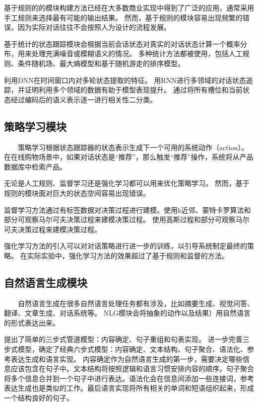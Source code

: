 \documentclass{clv3}
\begin{document}
基于规则的的模块构建方法已经在大多数商业实现中得到了广泛的应用，通常采用手工规则来选择最有可能的输出结果\cite{goddeau1996a}。
然而，基于规则的模块容易出现频繁的错误，因为实际对话往往不会按照人为设计的流程发展\cite{williams2013multi}。

基于统计的状态跟踪模块会根据当前会话状态对真实的对话状态计算一个概率分布\cite{williams2013the}，用来处理充满噪音或模糊语义的情况。
多种统计方法都被使用，包括人工规则\cite{wang2013a}、条件随机场\cite{ren2013dialog, lee2013structured, kim2014sequential}、最大熵模型\cite{williams2013multi}和基于随机游走\cite{williams2014web}的排序模型。

\cite{henderson2013deep}利用DNN在时间窗口内对多轮状态提取的特征。
\cite{mrkšić2015multi}用RNN进行多领域的对话状态追踪，并证明利用多个领域的数据有助于模型表现提升。
\cite{mrksic2017neural}通过将所有槽位和当前状态经过编码后的语义表示逐一进行相关性二分类。


\subsection{策略学习模块}
$\qquad$策略学习根据状态跟踪器的状态表示生成下一个可用的系统动作（action）。
在在线购物场景中，如果对话状态是“推荐”，那么触发“推荐”操作，系统将从产品数据库中检索产品。

无论是人工规则、监督学习还是强化学习都可以用来优化策略学习\cite{cuayáhuitl2015strategic}。
然而，基于规则的模块面对巨大的状态空间容易出现错误\cite{zhou2017building}。

监督学习方法通过有标签数据对决策过程进行建模。\cite{lef`evre2009k}使用k近邻、蒙特卡罗算法和部分可观察马尔可夫决策过程来建模决策过程。
\cite{gasic2014gaussian}使用高斯过程和部分可观察马尔可夫决策过程来建模决策过程。

强化学习方法的引入\cite{jurčíček2011natural, wen2017a, su2017sample}可以对对话策略进行进一步的训练，以引导系统制定最终的策略。
在实际实验中，强化学习方法的效果超过了基于规则和监督的方法。


\subsection{自然语言生成模块}
$\qquad$自然语言生成在很多自然语言处理任务都有涉及，比如摘要生成、视觉问答、翻译、文章生成、对话系统等。
NLG模块会将抽象的动作以及结果）用自然语言的形式表达出来。

\cite{reiter1994has}提出了简单的三步式管道模型：内容确定、句子重组和句表实现。
\cite{reiter2000building}进一步完善三步式模型，确定了经典六步式模型：内容确定、文本结构、句子聚合、语法化、参考表达生成和语言实现。
内容确定作为自然语言生成的第一步，需要决定哪些信息应该包含在句子中。文本结构将按照逻辑和语言习惯安排内容的顺序。句子聚合将多个信息合并到一个句子中进行表达。语法化会在信息间添加一些连接词，参考表达生成也是类似的工作。最后语言实现将所有相关的单词和短语组织起来，形成一个结构良好的句子。
\end{document}
